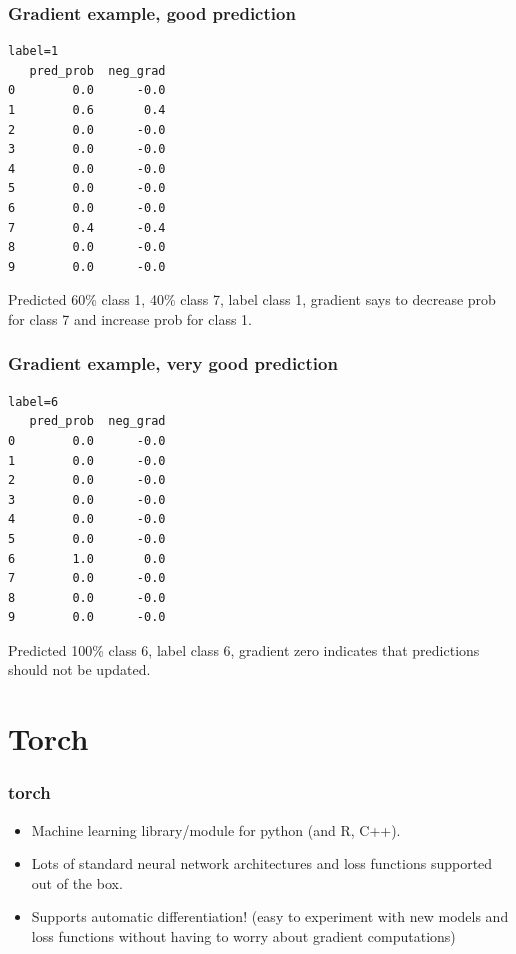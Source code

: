 \documentclass{beamer}
\begin{document}
\begin{frame}[fragile]
  \frametitle{Gradient example, good prediction}
\begin{verbatim}
label=1
   pred_prob  neg_grad
0        0.0      -0.0
1        0.6       0.4
2        0.0      -0.0
3        0.0      -0.0
4        0.0      -0.0
5        0.0      -0.0
6        0.0      -0.0
7        0.4      -0.4
8        0.0      -0.0
9        0.0      -0.0
\end{verbatim}
  Predicted 60\% class 1, 40\% class 7, label class 1, gradient says to
  decrease prob for class 7 and increase prob for class 1.
\end{frame}

\begin{frame}[fragile]
  \frametitle{Gradient example, very good prediction}
\begin{verbatim}
label=6
   pred_prob  neg_grad
0        0.0      -0.0
1        0.0      -0.0
2        0.0      -0.0
3        0.0      -0.0
4        0.0      -0.0
5        0.0      -0.0
6        1.0       0.0
7        0.0      -0.0
8        0.0      -0.0
9        0.0      -0.0
\end{verbatim}
  Predicted 100\% class 6, label class 6, gradient zero indicates that
  predictions should not be updated.
\end{frame}



\section{Torch}

\begin{frame}
  \frametitle{torch}
  \begin{itemize}
  \item Machine learning library/module for python (and R, C++).
  \item Lots of standard neural network architectures and loss
    functions supported out of the box.
  \item Supports automatic differentiation! (easy to experiment with
    new models and loss functions without having to worry about
    gradient computations)
  \end{itemize}
\end{frame}
\end{document}
